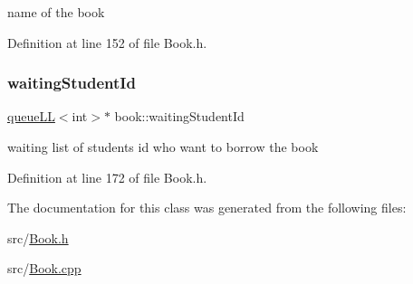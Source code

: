 name of the book 

Definition at line 152 of file Book.\+h.

\mbox{\label{classbook_a40ce04fcfbf99ffdbe7a4e1463588ee5}} 
\subsubsection{\texorpdfstring{waiting\+Student\+Id}{waitingStudentId}}
{\footnotesize\ttfamily \hyperlink{classqueue_l_l}{queue\+LL}$<$int$>$$\ast$ book\+::waiting\+Student\+Id\hspace{0.3cm}{\ttfamily [private]}}

waiting list of students\textquotesingle{} id who want to borrow the book 

Definition at line 172 of file Book.\+h.



The documentation for this class was generated from the following files\+:\begin{DoxyCompactItemize}
\item 
src/\hyperlink{_book_8h}{Book.\+h}\item 
src/\hyperlink{_book_8cpp}{Book.\+cpp}\end{DoxyCompactItemize}
